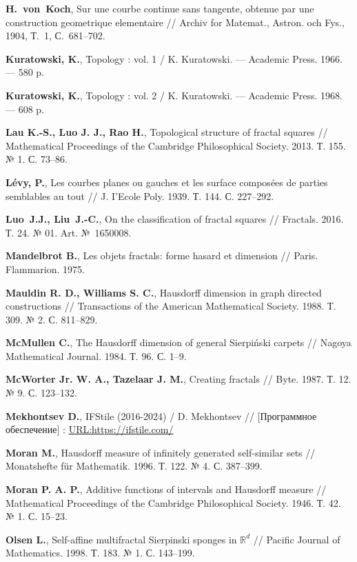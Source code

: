 \begin{thebibliography}{99}
{\bf H.~von~Koch},  
Sur une courbe continue sans tangente, obtenue par
une construction geometrique elementaire // 
Archiv for Matemat., Astron. och Fys., 1904, Т.~1, С.~681--702.

{\bf Kuratowski, K.}, 
Topology : vol. 1 / 
K. Kuratowski. --- Academic Press. 1966. --- 580 p.

{\bf Kuratowski, K.},
Topology : vol. 2 / 
K. Kuratowski. --- Academic Press. 1968. --- 608 p.

{\bf Lau K.-S., Luo J. J., Rao H.},
Topological structure of fractal squares // 
Mathematical Proceedings of the Cambridge Philosophical Society. 2013. Т. 155. № 1. С. 73--86.

{\bf L{\'e}vy, P.}, 
Les courbes planes ou gauches et les surface compos{\'e}es de parties semblables au tout // 
J. I’Ecole Poly. 1939. Т. 144. С. 227--292.

{\bf Luo~J.J., Liu~J.-C.},
On the classification of fractal squares
// Fractals. 2016. Т. 24. № 01. Art. №~1650008.

{\bf Mandelbrot B.},
Les objets fractals: forme hasard et dimension // 
Paris. Flammarion. 1975.

{\bf Mauldin R. D., Williams S. C.},
Hausdorff dimension in graph directed constructions // 
Transactions of the American Mathematical Society. 1988. Т. 309. № 2. С. 811--829.

{\bf McMullen C.},
The Hausdorff dimension of general Sierpiński carpets // 
Nagoya Mathematical Journal. 1984. Т. 96. С. 1–9.

{\bf McWorter Jr. W. A., Tazelaar J. M.},
Creating fractals // 
Byte. 1987. Т. 12. № 9. С. 123--132.

{\bf Mekhontsev D.}, 
IFStile (2016-2024) / D. Mekhontsev // [Программное обеспечение] : 
\href{https://ifstile.com/}{URL:https://ifstile.com/}

{\bf Moran M.},
Hausdorff measure of infinitely generated self-similar sets // 
Monatshefte für Mathematik. 1996. Т. 122. № 4. С. 387--399.

{\bf Moran P. A. P.},
Additive functions of intervals and Hausdorff measure // 
Mathematical Proceedings of the Cambridge Philosophical Society. 1946. Т. 42. № 1. С. 15–23.

{\bf Olsen L.}, 
Self-affine multifractal Sierpinski sponges in $\mathbb{R}^d$ // 
Pacific Journal of Mathematics. 1998. Т. 183. № 1. С. 143--199.


\end{thebibliography}
